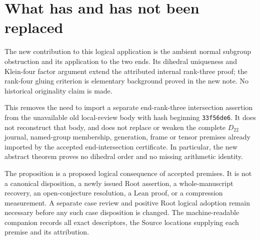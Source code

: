 \documentclass[11pt]{article}
\begin{document}
\section*{What has and has not been replaced}

The new contribution to this logical application is the ambient normal
subgroup obstruction and its application to the two ends.  Its dihedral
uniqueness and Klein-four factor argument extend the attributed internal
rank-three proof; the rank-four gluing criterion is elementary background
proved in the new note.  No historical originality claim is made.

This removes the need to import a separate end-rank-three intersection
assertion from the unavailable old local-review body with hash beginning
\texttt{33f56de6}.  It does not reconstruct that body, and does not
replace or weaken the complete $D_{22}$ journal, named-group membership,
generation, frame or tensor premises already imported by the accepted
end-intersection certificate.  In particular, the new abstract theorem
proves no dihedral order and no missing arithmetic identity.

The proposition is a proposed logical consequence of accepted premises.
It is not a canonical disposition, a newly issued Root assertion, a
whole-manuscript recovery, an open-conjecture resolution, a Lean proof,
or a compression measurement.  A separate case review and positive Root
logical adoption remain necessary before any such case disposition is
changed.  The machine-readable companion records all exact descriptors,
the Source locations supplying each premise and its attribution.
\end{document}
